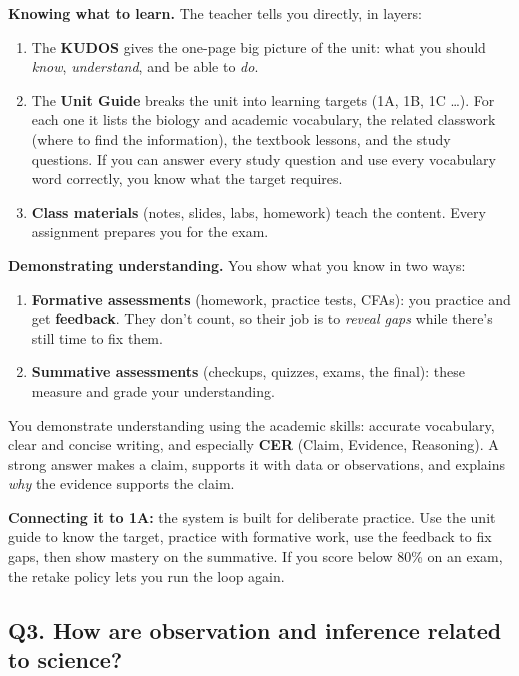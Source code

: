 \documentclass[11pt,letterpaper]{article}
\begin{document}
\textbf{Knowing what to learn.} The teacher tells you directly, in layers:
\begin{enumerate}
  \item The \textbf{KUDOS} gives the one-page big picture of the unit: what you should \emph{know}, \emph{understand}, and be able to \emph{do}.
  \item The \textbf{Unit Guide} breaks the unit into learning targets (1A, 1B, 1C \dots{}). For each one it lists the biology and academic vocabulary, the related classwork (where to find the information), the textbook lessons, and the study questions. If you can answer every study question and use every vocabulary word correctly, you know what the target requires.
  \item \textbf{Class materials} (notes, slides, labs, homework) teach the content. Every assignment prepares you for the exam.
\end{enumerate}

\textbf{Demonstrating understanding.} You show what you know in two ways:
\begin{enumerate}
  \item \textbf{Formative assessments} (homework, practice tests, CFAs): you practice and get \textbf{feedback}. They don't count, so their job is to \emph{reveal gaps} while there's still time to fix them.
  \item \textbf{Summative assessments} (checkups, quizzes, exams, the final): these measure and grade your understanding.
\end{enumerate}

You demonstrate understanding using the academic skills: accurate vocabulary, clear and concise writing, and especially \textbf{CER} (Claim, Evidence, Reasoning). A strong answer makes a claim, supports it with data or observations, and explains \emph{why} the evidence supports the claim.

\textbf{Connecting it to 1A:} the system is built for deliberate practice. Use the unit guide to know the target, practice with formative work, use the feedback to fix gaps, then show mastery on the summative. If you score below 80\% on an exam, the retake policy lets you run the loop again.


\subsection{Q3. How are observation and inference related to science?}
\end{document}
